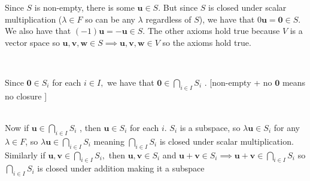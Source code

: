 \documentclass{report}
\begin{document}
\begin{myproof}
    
Since $S$ is non-empty, there is some $\mathbf{u}\in S$. But since $S$ is closed under scalar multiplication ($\lambda \in F$ so can be any $\lambda $ regardless of $S$), we have that $0\mathbf{u} =\mathbf{0} \in S$. We also have that $(-1)\mathbf{u}=-\mathbf{u} \in S$. The other axioms hold true because $V$ is a vector space so $\mathbf{u, v, w} \in S \implies \mathbf{u, v, w}\in V $ so the axioms hold true.


\end{myproof}
~\\
\begin{myproof}
    
Since $\mathbf{0} \in S_i$  for each $i\in I,$  we have that $\mathbf{0} \in \bigcap _{i\in I}S_i$ . [non-empty + no $\mathbf{0}$ means no closure ]

~\\
Now if $\mathbf{u} \in \bigcap _{i\in I}S_i$ , then $\mathbf{u} \in S_i$  for each $i$. $S_i$  is a subspace, so $\lambda \mathbf{u} \in S_i$  for any $\lambda \in F$, so $\lambda \mathbf{u} \in \bigcap _{i\in I}S_i$  meaning $\bigcap _{i\in I}S_i$  is closed under scalar multiplication. Similarly if $\mathbf{u, v} \in \bigcap _{i\in I}S_i ,$  then $\mathbf{u,v} \in S_i$  and $\mathbf{u}+\mathbf{v} \in S_i \implies \mathbf{u+v} \in \bigcap _{i\in I}S_i$  so $\bigcap _{i\in I}S_i$  is closed under addition making it a subspace

\end{myproof}

\end{document}
